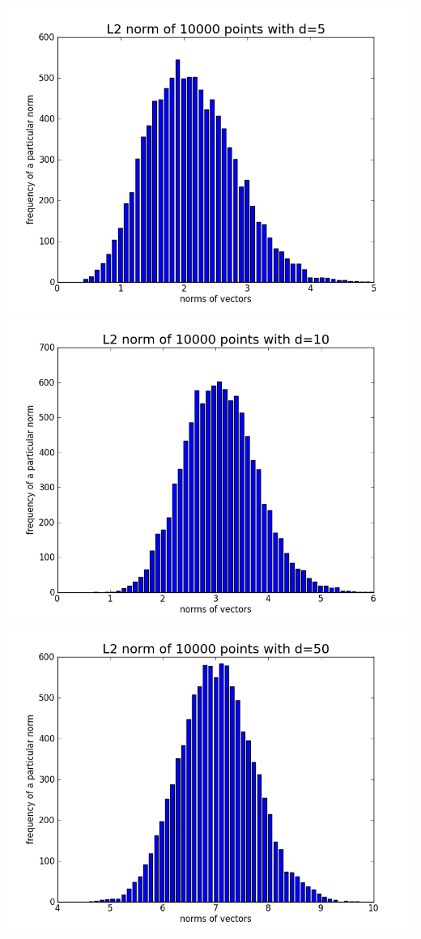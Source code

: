 \documentclass[11pt]{article}
\begin{document}
\begin{center}
\includegraphics[scale=0.25]{p2d5.png}
\includegraphics[scale=0.25]{p2d10.png}
\includegraphics[scale=0.25]{p2d50.png}
\end{center}
\end{document}

